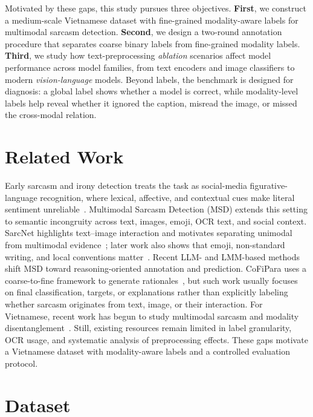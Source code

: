 \documentclass[conference]{IEEEtran}
\begin{document}
Motivated by these gaps, this study pursues three objectives. \textbf{First}, we construct a medium-scale Vietnamese dataset with fine-grained modality-aware labels for multimodal sarcasm detection. \textbf{Second}, we design a two-round annotation procedure that separates coarse binary labels from fine-grained modality labels. \textbf{Third}, we study how text-preprocessing \textit{ablation} scenarios affect model performance across model families, from text encoders and image classifiers to modern \textit{vision-language} models.
Beyond labels, the benchmark is designed for diagnosis: a global label shows whether a model is correct, while modality-level labels help reveal whether it ignored the caption, misread the image, or missed the cross-modal relation.
\section{Related Work}
Early sarcasm and irony detection treats the task as social-media figurative-language recognition, where lexical, affective, and contextual cues make literal sentiment unreliable~\cite{reyes_humor_2012,farias_irony_2016,ahmed_hamza_computational_2023,maladry_limitations_2024}. Multimodal Sarcasm Detection (MSD) extends this setting to semantic incongruity across text, images, emoji, OCR text, and social context. SarcNet highlights text--image interaction and motivates separating unimodal from multimodal evidence~\cite{yue-etal-2024-sarcnet}; later work also shows that emoji, non-standard writing, and local conventions matter~\cite{Wahyuni_Suryanto_Arviani_2025}.
Recent LLM- and LMM-based methods shift MSD toward reasoning-oriented annotation and prediction. CoFiPara uses a coarse-to-fine framework to generate rationales~\cite{chen-etal-2024-cofipara}, but such work usually focuses on final classification, targets, or explanations rather than explicitly labeling whether sarcasm originates from text, image, or their interaction.
For Vietnamese, recent work has begun to study multimodal sarcasm and modality disentanglement~\cite{10.1007/978-981-96-8892-0_31}. Still, existing resources remain limited in label granularity, OCR usage, and systematic analysis of preprocessing effects. These gaps motivate a Vietnamese dataset with modality-aware labels and a controlled evaluation protocol.
\section{Dataset}
\label{sec:dataset}
\end{document}
